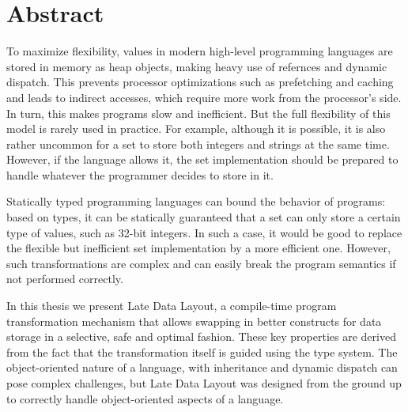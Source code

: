 

\cleardoublepage
\chapter*{Abstract}

\vspace{1em}

To maximize flexibility, values in modern high-level programming languages are stored in memory as heap objects, making heavy use of refernces and dynamic dispatch. This prevents processor optimizations such as prefetching and caching and leads to indirect accesses, which require more work from the processor's side. In turn, this makes programs slow and inefficient. But the full flexibility of this model is rarely used in practice. For example, although it is possible, it is also rather uncommon for a set to store both integers and strings at the same time. However, if the language allows it, the set implementation should be prepared to handle whatever the programmer decides to store in it.

\vspace{1em}

Statically typed programming languages can bound the behavior of programs: based on types, it can be statically guaranteed that a set can only store a certain type of values, such as 32-bit integers. In such a case, it would be good to replace the flexible but inefficient set implementation by a more efficient one. However, such transformations are complex and can easily break the program semantics if not performed correctly.

\vspace{1em}

In this thesis we present Late Data Layout, a compile-time program transformation mechanism that allows swapping in better constructs for data storage in a selective, safe and optimal fashion. These key properties are derived from the fact that the transformation itself is guided using the type system. The object-oriented nature of a language, with inheritance and dynamic dispatch can pose complex challenges, but Late Data Layout was designed from the ground up to correctly handle object-oriented aspects of a language.

\vspace{1em}

